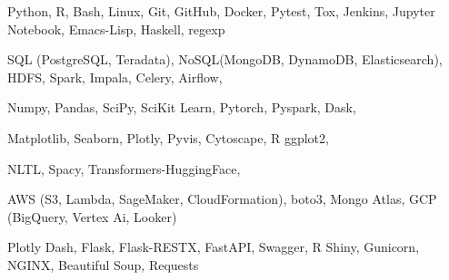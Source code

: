 


\begin{cvskills}


{
Python, R, Bash, Linux, Git, GitHub, Docker, Pytest, Tox, Jenkins, Jupyter Notebook, Emacs-Lisp, Haskell, regexp
}

{
SQL (PostgreSQL, Teradata), NoSQL(MongoDB, DynamoDB, Elasticsearch), HDFS, Spark, Impala, Celery, Airflow,
}

{
Numpy, Pandas, SciPy, SciKit Learn, Pytorch, Pyspark, Dask,
}

{
Matplotlib, Seaborn, Plotly, Pyvis, Cytoscape, R ggplot2,
}

{
NLTL, Spacy, Transformers-HuggingFace,
}

{
AWS (S3, Lambda, SageMaker, CloudFormation), boto3, Mongo Atlas, GCP (BigQuery, Vertex Ai, Looker)
}

{
Plotly Dash, Flask, Flask-RESTX, FastAPI, Swagger, R Shiny, Gunicorn, NGINX, Beautiful Soup, Requests
}













\end{cvskills}
